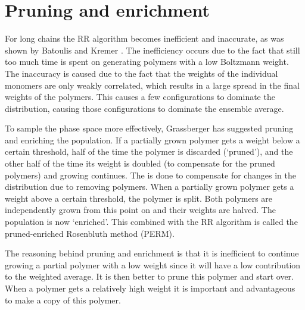 \section{Pruning and enrichment}
For long chains the RR algorithm becomes inefficient and inaccurate, as was shown by Batoulis and Kremer \cite{batoulis1988statistical}. The inefficiency occurs due to the fact that still too much time is spent on generating polymers with a low Boltzmann weight. The inaccuracy is caused due to the fact that the weights of the individual monomers are only weakly correlated, which results in a large spread in the final weights of the polymers. This causes a few configurations to dominate the distribution, causing those configurations to dominate the ensemble average. 

To sample the phase space more effectively, Grassberger has suggested pruning and enriching the population. If a partially grown polymer gets a weight below a certain threshold, half of the time the polymer is discarded (`pruned'), and the other half of the time its weight is doubled (to compensate for the pruned polymers) and growing continues. The is done to compensate for changes in the distribution due to removing polymers. When a partially grown polymer gets a weight above a certain threshold, the polymer is split. Both polymers are independently grown from this point on and their weights are halved. The population is now `enriched'. This combined with the RR algorithm is called the pruned-enriched Rosenbluth method (PERM). 

The reasoning behind pruning and enrichment is that it is inefficient to continue growing a partial polymer with a low weight since it will have a low contribution to the weighted average. It is then better to prune this polymer and start over. When a polymer gets a relatively high weight it is important and advantageous to make a copy of this polymer.

\begin{Figure}
    \vspace{18 mm}
    \centering
    \def\svgwidth{\linewidth}
    
    \label{fig:perm}
\end{Figure}

